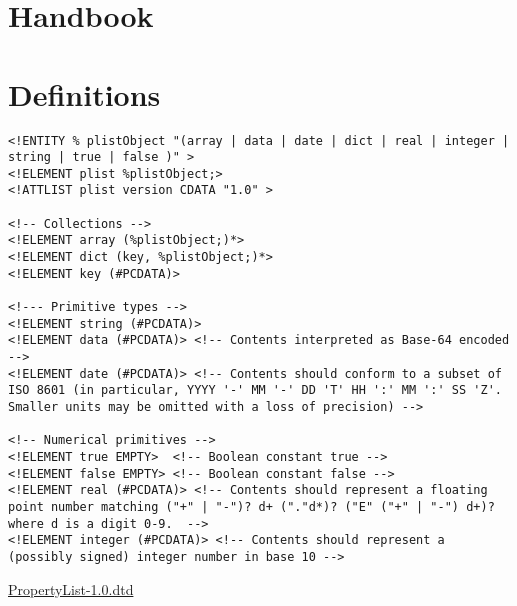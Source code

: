 








\chapter{Handbook}

\chapter{Definitions}

\begin{table}[htdp]
\begin{center}
\begin{lstlisting}[mathescape]
<!ENTITY % plistObject "(array | data | date | dict | real | integer | string | true | false )" >
<!ELEMENT plist %plistObject;>
<!ATTLIST plist version CDATA "1.0" >

<!-- Collections -->
<!ELEMENT array (%plistObject;)*>
<!ELEMENT dict (key, %plistObject;)*>
<!ELEMENT key (#PCDATA)>

<!--- Primitive types -->
<!ELEMENT string (#PCDATA)>
<!ELEMENT data (#PCDATA)> <!-- Contents interpreted as Base-64 encoded -->
<!ELEMENT date (#PCDATA)> <!-- Contents should conform to a subset of ISO 8601 (in particular, YYYY '-' MM '-' DD 'T' HH ':' MM ':' SS 'Z'.  Smaller units may be omitted with a loss of precision) -->

<!-- Numerical primitives -->
<!ELEMENT true EMPTY>  <!-- Boolean constant true -->
<!ELEMENT false EMPTY> <!-- Boolean constant false -->
<!ELEMENT real (#PCDATA)> <!-- Contents should represent a floating point number matching ("+" | "-")? d+ ("."d*)? ("E" ("+" | "-") d+)? where d is a digit 0-9.  -->
<!ELEMENT integer (#PCDATA)> <!-- Contents should represent a (possibly signed) integer number in base 10 -->
\end{lstlisting}
\caption{\href{http://www.apple.com/DTDs/PropertyList-1.0.dtd}{PropertyList-1.0.dtd}}
\label{tab:PLISTDTD}
\end{center}

\end{table}%

